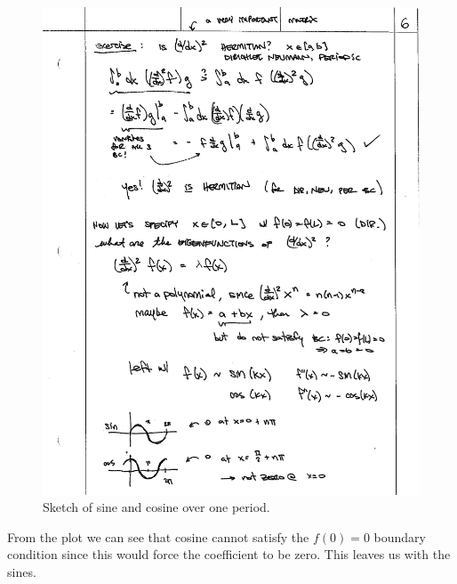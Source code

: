 \begin{figure}[tb]
    \centering
    \includegraphics[width=.7\textwidth]{figures/sinesandcosines.pdf}
    \caption{Sketch of sine and cosine over one period.}
    \label{fig:sinecosine}
\end{figure}
From the plot we can see that cosine cannot satisfy the $f(0)=0$ boundary condition since this would force the coefficient to be zero. This leaves us with the sines. 

